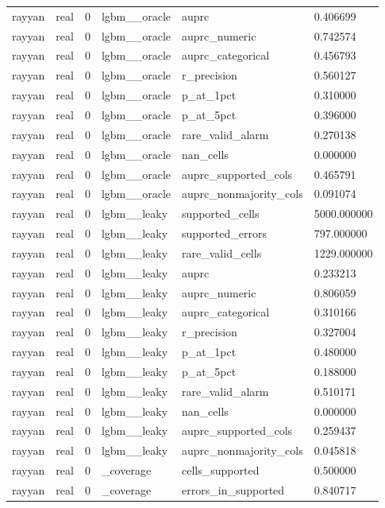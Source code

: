 \begin{tabular}{llllll}
rayyan & real & 0 & lgbm\_\_oracle & auprc & 0.406699 \\
rayyan & real & 0 & lgbm\_\_oracle & auprc\_numeric & 0.742574 \\
rayyan & real & 0 & lgbm\_\_oracle & auprc\_categorical & 0.456793 \\
rayyan & real & 0 & lgbm\_\_oracle & r\_precision & 0.560127 \\
rayyan & real & 0 & lgbm\_\_oracle & p\_at\_1pct & 0.310000 \\
rayyan & real & 0 & lgbm\_\_oracle & p\_at\_5pct & 0.396000 \\
rayyan & real & 0 & lgbm\_\_oracle & rare\_valid\_alarm & 0.270138 \\
rayyan & real & 0 & lgbm\_\_oracle & nan\_cells & 0.000000 \\
rayyan & real & 0 & lgbm\_\_oracle & auprc\_supported\_cols & 0.465791 \\
rayyan & real & 0 & lgbm\_\_oracle & auprc\_nonmajority\_cols & 0.091074 \\
rayyan & real & 0 & lgbm\_\_leaky & supported\_cells & 5000.000000 \\
rayyan & real & 0 & lgbm\_\_leaky & supported\_errors & 797.000000 \\
rayyan & real & 0 & lgbm\_\_leaky & rare\_valid\_cells & 1229.000000 \\
rayyan & real & 0 & lgbm\_\_leaky & auprc & 0.233213 \\
rayyan & real & 0 & lgbm\_\_leaky & auprc\_numeric & 0.806059 \\
rayyan & real & 0 & lgbm\_\_leaky & auprc\_categorical & 0.310166 \\
rayyan & real & 0 & lgbm\_\_leaky & r\_precision & 0.327004 \\
rayyan & real & 0 & lgbm\_\_leaky & p\_at\_1pct & 0.480000 \\
rayyan & real & 0 & lgbm\_\_leaky & p\_at\_5pct & 0.188000 \\
rayyan & real & 0 & lgbm\_\_leaky & rare\_valid\_alarm & 0.510171 \\
rayyan & real & 0 & lgbm\_\_leaky & nan\_cells & 0.000000 \\
rayyan & real & 0 & lgbm\_\_leaky & auprc\_supported\_cols & 0.259437 \\
rayyan & real & 0 & lgbm\_\_leaky & auprc\_nonmajority\_cols & 0.045818 \\
rayyan & real & 0 & \_coverage & cells\_supported & 0.500000 \\
rayyan & real & 0 & \_coverage & errors\_in\_supported & 0.840717 \\

\end{tabular}
